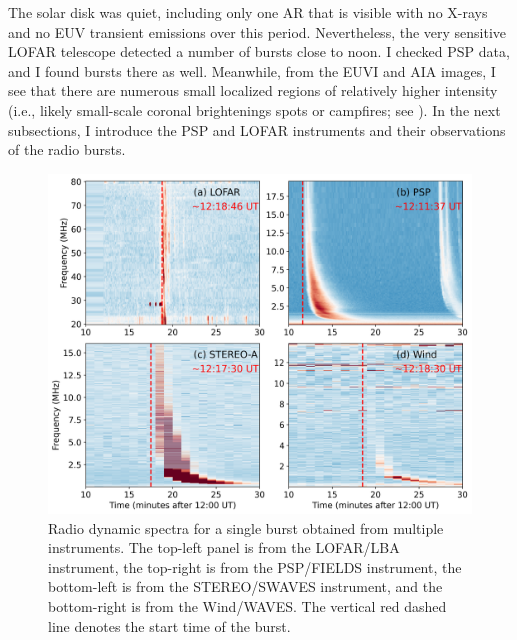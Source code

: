 The solar disk was quiet, including only one AR that is visible with no X-rays and no EUV transient emissions over this period.
Nevertheless, the very sensitive LOFAR telescope detected a number of bursts close to noon. I checked PSP data, and I found bursts there as well.
Meanwhile, from the EUVI and AIA images, I see that there are numerous small localized regions of relatively higher intensity (i.e., likely small-scale coronal brightenings spots or campfires; see \cite{young_2018, madjarska_2019, berghmans_2021}).
In the next subsections, I introduce the PSP and LOFAR instruments and their observations of the radio bursts.

\begin{figure}
\centering
\includegraphics[width=0.9\hsize]{chapter3/figs/all_dyspec.png}
\caption{Radio dynamic spectra for a single burst obtained from multiple instruments. The top-left panel is from the LOFAR/LBA instrument, the top-right is from the PSP/FIELDS instrument, the bottom-left is from the STEREO/SWAVES instrument, and the bottom-right is from the Wind/WAVES. The vertical red dashed line denotes the start time of the burst.}
\label{fig_alldyspec}
\end{figure}

